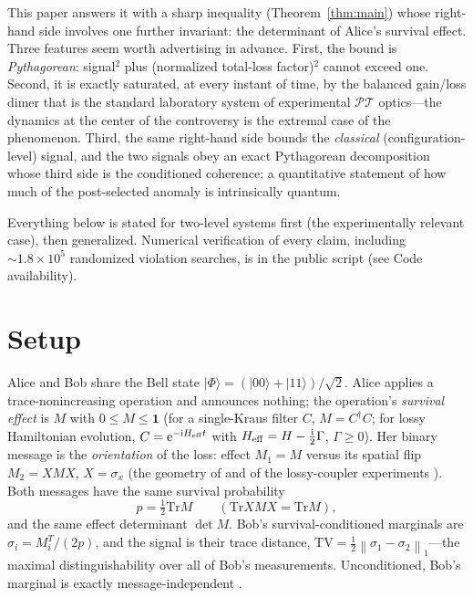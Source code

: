 \documentclass[11pt]{article}
\theoremstyle{remark}
\newcommand{\PT}{\mathcal{PT}}
\newcommand{\ii}{\mathrm{i}}
\newcommand{\ee}{\mathrm{e}}
\newcommand{\TV}{\mathrm{TV}}
\newcommand{\Tr}{\mathrm{Tr}}
\newcommand{\norm}[1]{\left\lVert #1 \right\rVert}
\newcommand{\ket}[1]{|#1\rangle}
\begin{document}
This paper answers it with a sharp inequality
(Theorem~\ref{thm:main}) whose right-hand side involves one further
invariant: the determinant of Alice's survival effect. Three features
seem worth advertising in advance. First, the bound is
\emph{Pythagorean}: signal$^2$ plus (normalized total-loss
factor)$^2$ cannot exceed one. Second, it is exactly saturated, at
every instant of time, by the balanced gain/loss dimer that is the
standard laboratory system of experimental $\PT$ optics---the
dynamics at the center of the controversy is the extremal case of
the phenomenon. Third, the same right-hand side bounds the
\emph{classical} (configuration-level) signal, and the two signals
obey an exact Pythagorean decomposition whose third side is the
conditioned coherence: a quantitative statement of how much of the
post-selected anomaly is intrinsically quantum.

Everything below is stated for two-level systems first (the
experimentally relevant case), then generalized. Numerical
verification of every claim, including $\sim1.8\times10^{5}$
randomized violation searches, is in the public script
(see Code availability).

\section{Setup}
\label{sec:setup}

Alice and Bob share the Bell state
$\ket{\Phi}=(\ket{00}+\ket{11})/\sqrt2$. Alice applies a
trace-nonincreasing operation and announces nothing; the operation's
\emph{survival effect} is $M$ with $0\le M\le\mathbf 1$ (for a
single-Kraus filter $C$, $M=C^{\dagger}C$; for lossy Hamiltonian
evolution, $C=\ee^{-\ii H_{\rm eff}t}$ with
$H_{\rm eff}=H-\tfrac{\ii}{2}\Gamma$, $\Gamma\ge0$). Her binary
message is the \emph{orientation} of the loss: effect $M_{1}=M$
versus its spatial flip $M_{2}=XMX$, $X=\sigma_x$ (the geometry of
\cite{LHFL2014} and of the lossy-coupler experiments
\cite{Tang2016}). Both messages have the same survival probability
\begin{equation}
p=\tfrac12\Tr M
\qquad(\Tr XMX=\Tr M),
\end{equation}
and the same effect determinant $\det M$. Bob's
survival-conditioned marginals are
$\sigma_{i}=M_{i}^{T}/(2p)$, and the signal is their trace
distance, $\TV=\tfrac12\norm{\sigma_1-\sigma_2}_1$---the maximal
distinguishability over all of Bob's measurements. Unconditioned,
Bob's marginal is exactly message-independent \cite{instantaneous}.
\end{document}
